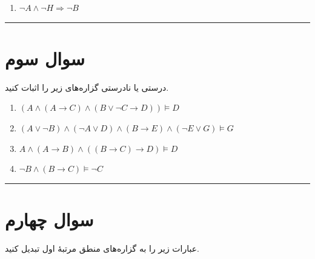 \documentclass[a4paper,10pt]{article}
\begin{document}
\begin{latin}
\begin{enumerate}
	\item $\neg A \wedge \neg H \Rightarrow \neg B$
\end{enumerate}
\end{latin}
\textcolor{AccentCyan}{\rule{\linewidth}{0.4pt}}
\section{\textcolor{AccentGold}{سوال سوم}}

\noindent درستی یا نادرستی گزاره‌های زیر را اثبات کنید.

\begin{latin}
\begin{enumerate}
	\item $(A \wedge (A \rightarrow C) \wedge (B \vee \neg C \rightarrow D)) \models D$
	\item $(A \vee \neg B) \wedge (\neg A \vee D) \wedge (B \rightarrow E) \wedge (\neg E \vee G) \models G$
	\item $A \wedge (A \rightarrow B) \wedge ((B \rightarrow C) \rightarrow D) \models D$
	\item $\neg B \wedge (B \rightarrow C) \models \neg C$
\end{enumerate}
\end{latin}
\textcolor{AccentCyan}{\rule{\linewidth}{0.4pt}}


\section{\textcolor{AccentGold}{سوال چهارم}}
\noindent عبارات زیر را به گزاره‌های منطق مرتبۀ اول تبدیل کنید.
\end{document}
